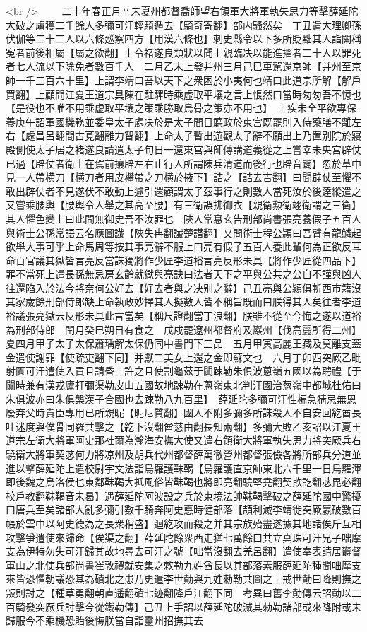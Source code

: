 <br />
　　二十年春正月辛未夏州都督喬師望右領軍大將軍執失思力等擊薛延陀大破之虜獲二千餘人多彌可汗輕騎遁去【騎奇寄翻】部内騷然矣　丁丑遣大理卿孫伏伽等二十二人以六條廵察四方【用漢六條也】刺史縣令以下多所貶黜其人詣闕稱寃者前後相屬【屬之欲翻】上令褚遂良類狀以聞上親臨决以能進擢者二十人以罪死者七人流以下除免者數百千人　二月乙未上發并州三月己巳車駕還京師【并州至京師一千三百六十里】上謂李靖曰吾以天下之衆困於小夷何也靖曰此道宗所解【解戶買翻】上顧問江夏王道宗具陳在駐驆時乘虚取平壤之言上悵然曰當時匆匆吾不憶也【是役也不唯不用乘虚取平壤之策乘勝取烏骨之策亦不用也】　上疾未全平欲專保養庚午詔軍國機務並委皇太子處决於是太子間日聼政於東宫既罷則入侍藥膳不離左右【處昌呂翻間古莧翻離力智翻】上命太子暫出遊觀太子辭不願出上乃置别院於寢殿側使太子居之褚遂良請遣太子旬日一還東宫與師傅講道義從之上嘗幸未央宫辟仗已過【辟仗者衛士在駕前攘辟左右止行人所謂陳兵清道而後行也辟音闢】忽於草中見一人帶横刀【横刀者用皮襻帶之刀横於掖下】詰之【詰去吉翻】曰聞辟仗至懼不敢出辟仗者不見遂伏不敢動上遽引還顧謂太子茲事行之則數人當死汝於後逹縱遣之又嘗乘腰輿【腰輿令人舉之其高至腰】有三衛誤拂御衣【親衛勲衛翊衛謂之三衛】其人懼色變上曰此間無御史吾不汝罪也　陜人常惪玄告刑部尚書張亮養假子五百人與術士公孫常語云名應圖䜟【陜失冉翻䜟楚譛翻】又問術士程公頴曰吾臂有龍鱗起欲舉大事可乎上命馬周等按其事亮辭不服上曰亮有假子五百人養此輩何為正欲反耳命百官議其獄皆言亮反當誅獨將作少匠李道裕言亮反形未具【將作少匠從四品下】罪不當死上遣長孫無忌房玄齡就獄與亮訣曰法者天下之平與公共之公自不謹與凶人往還陷入於法今將奈何公好去【好去者與之决别之辭】己丑亮與公潁俱斬西市籍沒其家歲餘刑部侍郎缺上命執政妙擇其人擬數人皆不稱旨既而曰朕得其人矣往者李道裕議張亮獄云反形未具此言當矣【稱尺證翻當丁浪翻】朕雖不從至今悔之遂以道裕為刑部侍郎　閏月癸巳朔日有食之　戊戍罷遼州都督府及巖州【伐高麗所得二州】　夏四月甲子太子太保蕭瑀解太保仍同中書門下三品　五月甲寅高麗王藏及莫離支蓋金遣使謝罪【使疏吏翻下同】并獻二美女上還之金即蘇文也　六月丁卯西突厥乙毗射匱可汗遣使入貢且請昏上許之且使割龜茲于闐踈勒朱俱波蔥嶺五國以為聘禮【于闐時兼有漢戎廬扞彌渠勒皮山五國故地踈勒在蔥嶺東北判汗國治葱嶺中都城杜佑曰朱俱波亦曰朱俱槃漢子合國也去踈勒八九百里】　薛延陀多彌可汗性褊急猜忌無恩廢弃父時貴臣專用已所親昵【昵尼質翻】國人不附多彌多所誅殺人不自安回紇酋長吐迷度與僕骨同羅共擊之【紇下沒翻酋慈由翻長知兩翻】多彌大敗乙亥詔以江夏王道宗左衛大將軍阿史那社爾為瀚海安撫大使又遣右領衛大將軍執失思力將突厥兵右驍衛大將軍契苾何力將凉州及胡兵代州都督薛萬徹營州都督張儉各將所部兵分道並進以擊薛延陀上遣校尉宇文法詣烏羅護靺鞨【烏羅護直京師東北六千里一日烏羅渾即後魏之烏洛侯也東鄰靺鞨大抵風俗皆靺鞨也將即亮翻驍堅堯翻契欺訖翻苾毘必翻校戶教翻靺鞨音未曷】遇薛延陀阿波設之兵於東境法帥靺鞨擊破之薛延陀國中驚擾曰唐兵至矣諸部大亂多彌引數千騎奔阿史悳時健部落【頡利滅李靖徙突厥嬴破數百帳於雲中以阿史德為之長衆稍盛】迴紇攻而殺之并其宗族殆盡遂據其地諸俟斤互相攻擊爭遣使來歸命【俟渠之翻】薛延陀餘衆西走猶七萬餘口共立真珠可汗兄子咄摩支為伊特勿失可汗歸其故地尋去可汗之號【咄當沒翻去羌呂翻】遣使奉表請居欝督軍山之北使兵部尚書崔敦禮就安集之敕勒九姓酋長以其部落素服薛延陀種聞咄摩支來皆恐懼朝議恐其為磧北之患乃更遣李世勣與九姓勑勒共圖之上戒世勣曰降則撫之叛則討之【種草勇翻朝直遥翻磧七迹翻降戶江翻下同　考異曰舊李勣傳云詔勣以二百騎發突厥兵討擊今從鐵勒傳】己丑上手詔以薛延陀破滅其勑勒諸部或來降附或未歸服今不乘機恐貽後悔朕當自詣靈州招撫其去